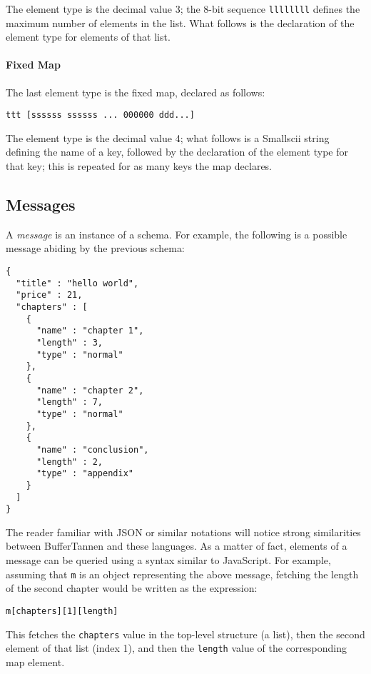 The element type is the decimal value 3; the 8-bit sequence \verb+llllllll+ defines the maximum number of elements in the list. What follows is the declaration of the element type for elements of that list.

\paragraph{Fixed Map} The last element type is the fixed map, declared as follows:
%
\begin{verbatim}
ttt [ssssss ssssss ... 000000 ddd...]
\end{verbatim}

The element type is the decimal value 4; what follows is a Smallscii string defining the name of a key, followed by the declaration of the element type for that key; this is repeated for as many keys the map declares.

\subsection{Messages}
\setcounter{paragraph}{0}

A \emph{message} is an instance of a schema. For example, the following is a possible message abiding by the previous schema:

\begin{verbatim}
{
  "title" : "hello world",
  "price" : 21,
  "chapters" : [
    {
      "name" : "chapter 1",
      "length" : 3,
      "type" : "normal"
    },
    {
      "name" : "chapter 2",
      "length" : 7,
      "type" : "normal"
    },
    {
      "name" : "conclusion",
      "length" : 2,
      "type" : "appendix"
    }
  ]
}
\end{verbatim}

The reader familiar with JSON or similar notations will notice strong similarities between BufferTannen and these languages. As a matter of fact, elements of a message can be queried using a syntax similar to JavaScript. For example, assuming that \verb+m+ is an object representing the above message, fetching the length of the second chapter would be written as the expression:

\begin{verbatim}
m[chapters][1][length]
\end{verbatim}

This fetches the \verb+chapters+ value in the top-level structure (a list), then the second element of that list (index 1), and then the \verb+length+ value of the corresponding map element.

